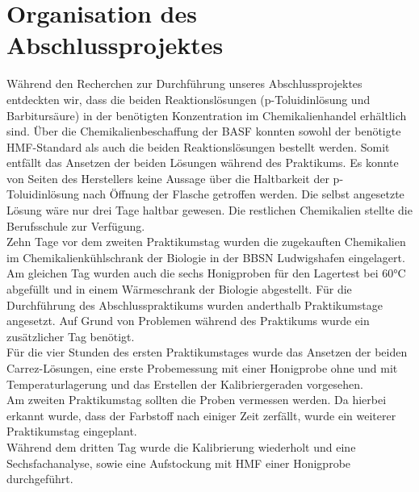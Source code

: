 \section{Organisation des Abschlussprojektes}
Während den Recherchen zur Durchführung unseres Abschlussprojektes entdeckten wir, dass die beiden Reaktionslösungen (p-Toluidinlösung und Barbitursäure) in der benötigten Konzentration im Chemikalienhandel erhältlich sind. Über die Chemikalienbeschaffung der BASF konnten sowohl der benötigte HMF-Standard als auch die beiden Reaktionslösungen bestellt werden. Somit entfällt das Ansetzen der beiden Lösungen während des Praktikums. Es konnte von Seiten des Herstellers keine Aussage über die Haltbarkeit der p-Toluidinlösung nach Öffnung der Flasche getroffen werden. Die selbst angesetzte Lösung wäre nur drei Tage haltbar gewesen. Die restlichen Chemikalien stellte die Berufsschule zur Verfügung. \\
Zehn Tage vor dem zweiten Praktikumstag wurden die zugekauften Chemikalien im Chemikalienkühlschrank der Biologie in der BBSN Ludwigshafen eingelagert. Am gleichen Tag wurden auch die sechs Honigproben für den Lagertest bei 60°C abgefüllt und in einem Wärmeschrank der Biologie abgestellt.
Für die Durchführung des Abschlusspraktikums wurden anderthalb Praktikumstage angesetzt. Auf Grund von Problemen während des Praktikums wurde ein zusätzlicher Tag benötigt. \\
Für die vier Stunden des ersten Praktikumstages wurde das Ansetzen der beiden Carrez-Lösungen, eine erste Probemessung mit einer Honigprobe ohne und mit Temperaturlagerung und das Erstellen der Kalibriergeraden vorgesehen.\\
Am zweiten Praktikumstag sollten die Proben vermessen werden. Da hierbei erkannt wurde, dass der Farbstoff nach einiger Zeit zerfällt, wurde ein weiterer Praktikumstag eingeplant.\\
Während dem dritten Tag wurde die Kalibrierung wiederholt und eine Sechsfachanalyse, sowie eine Aufstockung mit HMF einer Honigprobe durchgeführt.
 